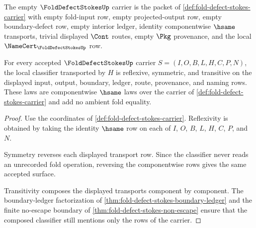 \begin{definition}
\label{def:fold-defect-stokes-empty-carrier}
The empty $\FoldDefectStokesUp$ carrier is the packet of \autoref{def:fold-defect-stokes-carrier} with empty fold-input row, empty projected-output row, empty boundary-defect row, empty interior ledger, identity componentwise $\hsame$ transports, trivial displayed $\Cont$ routes, empty $\Pkg$ provenance, and the local $\NameCert_{\FoldDefectStokesUp}$ row.
\end{definition}

\begin{theorem}
\label{thm:fold-defect-stokes-classifier-laws}
For every accepted $\FoldDefectStokesUp$ carrier $S=(I,O,B,L,H,C,P,N)$, the local classifier transported by $H$ is reflexive, symmetric, and transitive on the displayed input, output, boundary, ledger, route, provenance, and naming rows. These laws are componentwise $\hsame$ laws over the carrier of \autoref{def:fold-defect-stokes-carrier} and add no ambient fold equality.
\end{theorem}
\begin{proof}
Use the coordinates of \autoref{def:fold-defect-stokes-carrier}. Reflexivity is obtained by taking the identity $\hsame$ row on each of $I$, $O$, $B$, $L$, $H$, $C$, $P$, and $N$.

Symmetry reverses each displayed transport row. Since the classifier never reads an unrecorded fold operation, reversing the componentwise rows gives the same accepted surface.

Transitivity composes the displayed transports component by component. The boundary-ledger factorization of \autoref{thm:fold-defect-stokes-boundary-ledger} and the finite no-escape boundary of \autoref{thm:fold-defect-stokes-non-escape} ensure that the composed classifier still mentions only the rows of the carrier.
\end{proof}

